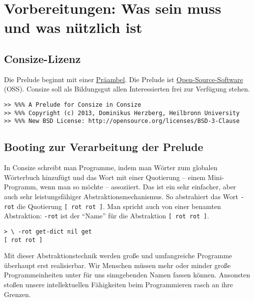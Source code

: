 \section{Vorbereitungen: Was sein muss und was nützlich ist}

\subsection{Consize-Lizenz}

Die Prelude beginnt mit einer \href{http://de.wikipedia.org/wiki/Pr%C3%A4ambel}{Präambel}.
Die Prelude ist \href{http://de.wikipedia.org/wiki/Open_source}{Open-Source-Software} (OSS). Consize soll als Bildungsgut allen Interessierten frei zur Verfügung stehen.

\begin{verbatim}
>> %%% A Prelude for Consize in Consize
>> %%% Copyright (c) 2013, Dominikus Herzberg, Heilbronn University
>> %%% New BSD License: http://opensource.org/licenses/BSD-3-Clause
\end{verbatim}

\subsection{Booting zur Verarbeitung der Prelude}
\label{Sec:LoadBootimage}

In Consize schreibt man Programme, indem man Wörter zum globalen Wörterbuch hinzufügt und das Wort mit einer Quotierung -- einem Mini-Programm, wenn man so möchte -- assoziiert. Das ist ein sehr einfacher, aber auch sehr leistungsfähiger Abstraktionsmechanismus. So abstrahiert das Wort \verb|-rot| die Quotierung \verb|[ rot rot ]|. Man spricht auch von einer benamten Abstraktion: \verb|-rot| ist der "`Name"' für die Abstraktion \verb|[ rot rot ]|.

\begin{verbatim}
> \ -rot get-dict nil get
[ rot rot ]

\end{verbatim}

Mit dieser Abstraktionstechnik werden große und umfangreiche Programme überhaupt erst realisierbar. Wir Menschen müssen mehr oder minder große Programmeinheiten unter für uns sinngebenden Namen fassen können. Ansonsten stoßen unsere intellektuellen Fähigkeiten beim Programmieren rasch an ihre Grenzen.

